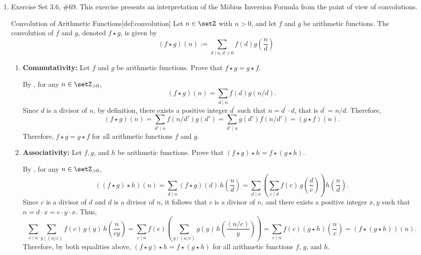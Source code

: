 \begin{enumerate}
  \newpage

  \item Exercise Set 3.6, \#69. This exercise presents an interpretation of the Möbius Inversion Formula from the point of view of convolutions.
  \begin{define}{Convolution of Arithmetic Functions}[def:convolution]
  Let $n \in \setZ$ with $n>0$, and let $f$ and $g$ be arithmetic functions. The convolution of $f$ and $g$, denoted $f \star g$, is given by
  \[
  (f \star g)(n):=\sum_{d \mid n, d>0} f(d) g\left(\frac{n}{d}\right)
  \]
  \end{define}
  \begin{enumerate}
    \item \textbf{Commutativity:} Let $f$ and $g$ be arithmetic functions. Prove that $f \star g=g \star f$.
    \label{prob:3.6.69-a}
    \begin{subprove}
      By , for any $n \in \setZ_{>0}$,
      \[
      (f \star g)(n) = \sum_{d \mid n} f(d) g(n/d).
      \]
      Since $d$ is a divisor of $n$, by definition, there exists a positive integer $d^\prime$ 
      such that $n = d^\prime\cdot d$, that is $d^\prime = n/d$. Therefore,
      \[
      (f \star g)(n) = \sum_{d' \mid n} f(n/d') g(d') = \sum_{d' \mid n} g(d') f(n/d') = (g \star f)(n).
      \]
      Therefore, $f \star g = g \star f$ for all arithmetic functions $f$ and $g$.
    \end{subprove}

    \item \textbf{Associativity:} Let $f, g$, and $h$ be arithmetic functions. 
    Prove that $(f \star g) \star h= f \star(g \star h)$.
    \label{prob:3.6.69-b}
    \begin{subprove}
      By , for any $n \in \setZ_{>0}$,
      \[
      ((f\star g)\star h)(n)
      = \sum_{d\mid n} (f\star g)(d)\,h\!\left(\frac{n}{d}\right)
      = \sum_{d\mid n}\left(\sum_{c\mid d} f(c)\,g\!\left(\frac{d}{c}\right)\right)
        h\!\left(\frac{n}{d}\right).
      \]
      Since \(c\) is a divisor of \(d\) and \(d\) is a divisor of \(n\), it follows that \(c\) is a divisor of \(n\),
      and there exists a positive integer \(x, y\) such that \(n = d\cdot x = c \cdot y \cdot x\).
      Thus, 
      \[
      \sum_{c\mid n} \sum_{y\mid (n/c)} f(c)\,g(y)\,h\!\left(\frac{n}{c y}\right)
      = \sum_{c\mid n} f(c)\left(\sum_{y\mid (n/c)} g(y)\,h\!\left(\frac{(n/c)}{y}\right)\right)
      = \sum_{c\mid n} f(c)(g \star h)\left(\frac{n}{c}\right)
      = (f \star (g \star h))(n).
      \]
      Therefore, by both equalities above, 
      \((f \star g) \star h = f \star (g \star h)\) for all arithmetic functions \(f\), \(g\), and \(h\).
    \end{subprove}


\end{enumerate}
\end{enumerate}
